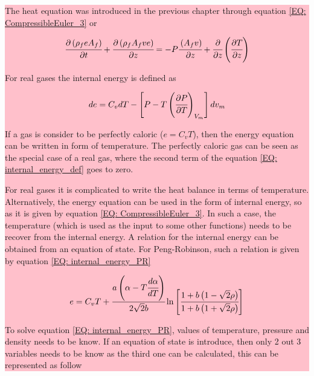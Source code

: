 \documentclass[../Article_Model_Parameters.tex]{subfiles}
\begin{document}
		\noindent\colorbox{pink}
		{
		\begin{minipage}{\columnwidth}
			The heat equation was introduced in the previous chapter through equation \ref{EQ: CompressibleEuler_3} or 
			
			{\footnotesize
			\begin{equation*}
				\cfrac{\partial \left( \rho_f e A_f \right) }{\partial t} + \cfrac{\partial \left( \rho_f A_f v e\right)}{\partial z} = -P\cfrac{\left( A_f v \right)}{\partial z} + \cfrac{\partial}{\partial z} \left( \cfrac{\partial T}{\partial z} \right) 
			\end{equation*}
			}
		
			For real gases the internal energy is defined as 

			{\footnotesize
				\begin{equation}
					de=C_vdT-\left[P-T\left(\cfrac{\partial P}{\partial T}\right)_{V_m}\right]dv_m
					\label{EQ: internal_energy_def}
				\end{equation} }
			
			If a gas is consider to be perfectly caloric ($e=C_v T$), then the energy equation can be written in form of temperature. The perfectly caloric gas can be seen as the special case of a real gas, where the second term of the equation \ref{EQ: internal_energy_def} goes to zero.
			
			For real gases it is complicated to write the heat balance in terms of temperature. Alternatively, the energy equation can be used in the form of internal energy, so as it is given by equation \ref{EQ: CompressibleEuler_3}. In such a case, the temperature (which is used as the input to some other functions) needs to be recover from the internal energy. A relation for the internal energy can be obtained from an equation of state. For Peng-Robinson, such a relation is given by equation \ref{EQ: internal_energy_PR}
			
			{\footnotesize
				\begin{equation}
					e = C_vT + \cfrac{a\left(\alpha -T\cfrac{d \alpha}{dT}\right)}{2\sqrt{2}b} \ln \left[ \cfrac{1+b\left(1-\sqrt{2}\rho\right) }{1+b\left(1+\sqrt{2}\rho\right)} \right]
					\label{EQ: internal_energy_PR}
				\end{equation}
			}
			
			To solve equation \ref{EQ: internal_energy_PR}, values of temperature, pressure and density needs to be know. If an equation of state is introduce, then only 2 out 3 variables needs to be know as the third one can be calculated, this can be represented as follow
			

\end{minipage}}
\end{document}

